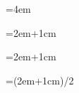 \documentclass{article}
\begin{document}

\indent\printlength{\parindent}\par
\parindent=1pt\indent\printlength{\parindent}\par
\parindent=4em\indent\printlength{\parindent}\par
{}\parindent\indent\printlength{\parindent}\par
\parindent=2em+1cm\indent\printlength{\parindent}\par
\parindent=\dimexpr2em+1cm\indent\printlength{\parindent}\par
\parindent=\dimexpr(2em+1cm)/2\indent\printlength{\parindent}\par




\vspace*{\fill}
\end{document}

